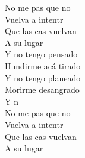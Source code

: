\begin{cancion}[Arrancármelo][Wos]
\begin{chorus}
	No me pas que no\\
	Vuelva a intentr\\
	Que las cas vuelvan\\
A su lugar\\
	 Y no tengo pensado\\
	 Hundirme acá tirado\\
	 Y no tengo planeado\\
	 Morirme desangrado\\
	Y n\\
	No me pas que no\\
	Vuelva a intentr\\
	Que las cas vuelvan\\
A su lugar\\
	\end{chorus}%
	\jump\\
\end{cancion}%
